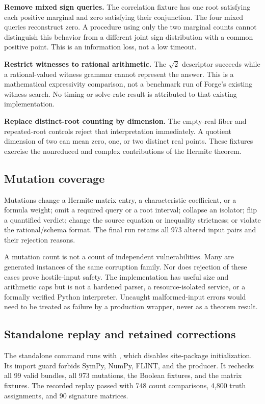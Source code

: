 \textbf{Remove mixed sign queries.} The correlation fixture has one root satisfying each positive marginal and zero satisfying their conjunction. The four mixed queries reconstruct zero. A procedure using only the two marginal counts cannot distinguish this behavior from a different joint sign distribution with a common positive point. This is an information loss, not a low timeout.

\textbf{Restrict witnesses to rational arithmetic.} The $\sqrt2$ descriptor succeeds while a rational-valued witness grammar cannot represent the answer. This is a mathematical expressivity comparison, not a benchmark run of Forge's existing witness search. No timing or solve-rate result is attributed to that existing implementation.

\textbf{Replace distinct-root counting by dimension.} The empty-real-fiber and repeated-root controls reject that interpretation immediately. A quotient dimension of two can mean zero, one, or two distinct real points. These fixtures exercise the nonreduced and complex contributions of the Hermite theorem.

\subsection{Mutation coverage}

Mutations change a Hermite-matrix entry, a characteristic coefficient, or a formula weight; omit a required query or a root interval; collapse an isolator; flip a quantified verdict; change the source equation or inequality strictness; or violate the rational/schema format. The final run retains all 973 altered input pairs and their rejection reasons.

A mutation count is not a count of independent vulnerabilities. Many are generated instances of the same corruption family. Nor does rejection of these cases prove hostile-input safety. The implementation has useful size and arithmetic caps but is not a hardened parser, a resource-isolated service, or a formally verified Python interpreter. Uncaught malformed-input errors would need to be treated as failure by a production wrapper, never as a theorem result.

\subsection{Standalone replay and retained corrections}

The standalone command runs with , which disables site-package initialization. Its import guard forbids SymPy, NumPy, FLINT, and the producer. It rechecks all 99 valid bundles, all 973 mutations, the Boolean fixtures, and the matrix fixtures. The recorded replay passed with 748 count comparisons, 4,800 truth assignments, and 90 signature matrices.

